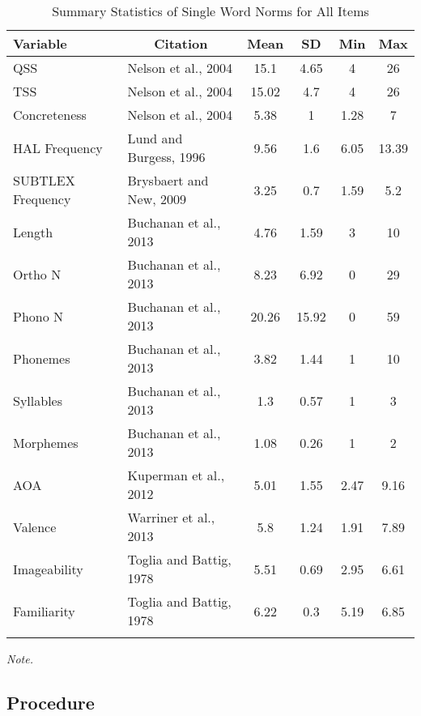 \documentclass[english,man]{apa6}
\theoremstyle{definition}
\theoremstyle{definition}
\theoremstyle{remark}
\begin{document}
\begin{table}[tbp]
\begin{center}
\begin{threeparttable}
\caption{\label{tab:unnamed-chunk-4}Summary Statistics of Single Word Norms for All Items}
\begin{tabular}{llcccc}
\toprule
Variable & \multicolumn{1}{c}{Citation} & \multicolumn{1}{c}{Mean} & \multicolumn{1}{c}{SD} & \multicolumn{1}{c}{Min} & \multicolumn{1}{c}{Max}\\
\midrule
QSS & Nelson et al., 2004 & 15.1 & 4.65 & 4 & 26\\
TSS & Nelson et al., 2004 & 15.02 & 4.7 & 4 & 26\\
Concreteness & Nelson et al., 2004 & 5.38 & 1 & 1.28 & 7\\
HAL Frequency & Lund and Burgess, 1996 & 9.56 & 1.6 & 6.05 & 13.39\\
SUBTLEX Frequency & Brysbaert and New, 2009 & 3.25 & 0.7 & 1.59 & 5.2\\
Length & Buchanan et al., 2013 & 4.76 & 1.59 & 3 & 10\\
Ortho N & Buchanan et al., 2013 & 8.23 & 6.92 & 0 & 29\\
Phono N & Buchanan et al., 2013 & 20.26 & 15.92 & 0 & 59\\
Phonemes & Buchanan et al., 2013 & 3.82 & 1.44 & 1 & 10\\
Syllables & Buchanan et al., 2013 & 1.3 & 0.57 & 1 & 3\\
Morphemes & Buchanan et al., 2013 & 1.08 & 0.26 & 1 & 2\\
AOA & Kuperman et al., 2012 & 5.01 & 1.55 & 2.47 & 9.16\\
Valence & Warriner et al., 2013 & 5.8 & 1.24 & 1.91 & 7.89\\
Imageability & Toglia and Battig, 1978 & 5.51 & 0.69 & 2.95 & 6.61\\
Familiarity & Toglia and Battig, 1978 & 6.22 & 0.3 & 5.19 & 6.85\\
\bottomrule
\addlinespace
\end{tabular}
\begin{tablenotes}[para]
\textit{Note.} 
\end{tablenotes}
\end{threeparttable}
\end{center}
\end{table}

\subsection{Procedure}\label{procedure}
\end{document}
